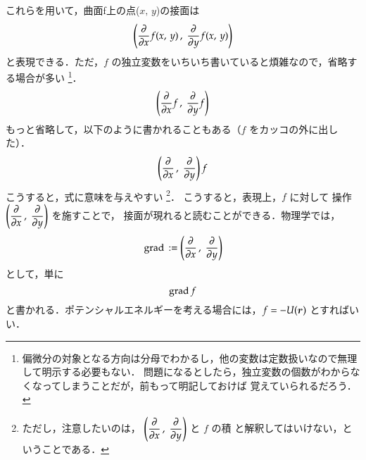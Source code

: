                 これらを用いて，曲面f上の点($x,\,y$)の接面は
                    \begin{equation*}
                        \left( \frac{\partial }{\partial x}f(x,\,y) \,,\; \frac{\partial }{\partial y}f(x,\,y) \right)
                    \end{equation*}
                と表現できる．ただ，$f$ の独立変数をいちいち書いていると煩雑なので，省略する場合が多い
                    \footnote{
                        偏微分の対象となる方向は分母でわかるし，他の変数は定数扱いなので無理して明示する必要もない．
                        問題になるとしたら，独立変数の個数がわからなくなってしまうことだが，前もって明記しておけば
                        覚えていられるだろう．
                    }．
                    \begin{equation*}
                        \left( \frac{\partial }{\partial x}f \,,\; \frac{\partial }{\partial y}f \right)
                    \end{equation*}
                もっと省略して，以下のように書かれることもある（$f$ をカッコの外に出した）．
                    \begin{equation*}
                        \left( \frac{\partial }{\partial x} \,,\;  \frac{\partial }{\partial y} \right) f
                    \end{equation*}
                こうすると，式に意味を与えやすい
                    \footnote{
                        ただし，注意したいのは，
                        $\displaystyle \left( \frac{\partial }{\partial x} \,,\; \frac{\partial }{\partial y} \right)$ と $f$ の積
                        と解釈してはいけない，ということである．
                    }．
                こうすると，表現上，$f$ に対して
                操作 $\displaystyle \left( \frac{\partial }{\partial x} \,,\; \frac{\partial }{\partial y} \right)$ を施すことで，
                接面が現れると読むことができる．物理学では，
                    \begin{equation*}
                        \mathrm{grad}\, := \left( \frac{\partial }{\partial x} \,,\; \frac{\partial }{\partial y} \right)
                    \end{equation*}
                として，単に
                    \begin{equation*}
                        \mathrm{grad}\, f
                    \end{equation*}
                と書かれる．ポテンシャルエネルギーを考える場合には，$f=-U(\boldsymbol{r})$ とすればいい．

